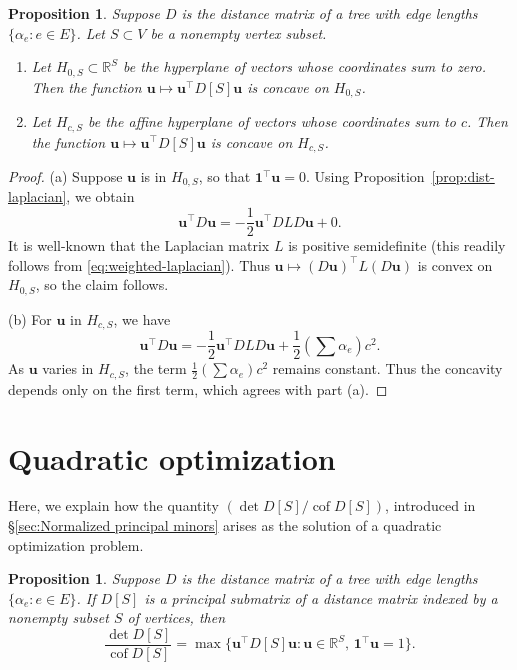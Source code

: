 \documentclass[12pt]{amsart}
\newtheorem{prop}[thm]{Proposition}
\theoremstyle{definition}
\newcommand{\RR}{\mathbb{R}}
\newcommand{\bone}{\mathbf{1}}
\newcommand{\boldu}{\mathbf{u}}
\newcommand{\tr}{\intercal}
\DeclareMathOperator{\cof}{cof}
\begin{document}
\begin{prop}
\label{prop:negdef-hyperplane}
Suppose $D$ is the distance matrix of a tree with edge lengths $\{\alpha_e \colon e \in E\}$.
Let $S \subset V$ be a nonempty vertex subset.
\begin{enumerate}[label=(\alph*)]

\item Let $H_{0, S} \subset \RR^S$ be the hyperplane of vectors whose coordinates sum to zero.
Then the function $\boldu \mapsto \boldu^\tr D[S] \boldu$ is concave on $H_{0, S}$.

\item Let $H_{c, S}$ be the affine hyperplane of vectors whose coordinates sum to $c$.
Then the function $\boldu \mapsto \boldu^\tr D[S] \boldu$ is concave on $H_{c, S}$.

\end{enumerate}
\end{prop}
\begin{proof}
(a)
Suppose $\boldu$ is in $H_{0, S}$, so that $\bone^\tr \boldu = 0$.
Using Proposition~\ref{prop:dist-laplacian}, we obtain
\[
	\boldu^\tr D\boldu = - \frac12 \boldu^\tr DLD \boldu + 0.
\]
It is well-known that the Laplacian matrix $L$ is positive semidefinite (this readily follows from \eqref{eq:weighted-laplacian}). 
Thus $\boldu \mapsto (D \boldu)^\tr L (D \boldu)$ is convex on $H_{0, S}$, so the claim follows.

(b)
For $\boldu$ in $H_{c, S}$, we have
\[
	\boldu^\tr D\boldu = - \frac12 \boldu^\tr DLD \boldu + \frac12 \left(\sum \alpha_e\right) c^2 .
\]
As $\boldu$ varies in $H_{c, S}$, the term $\frac12 \left(\sum \alpha_e\right) c^2$ remains constant.
Thus the concavity depends only on the first term, which agrees with part (a).
\end{proof}


\section{Quadratic optimization}
\label{sec:optimization}

Here, we explain how the quantity $({\det D[S]}/{\cof D[S]})$, introduced in \S\ref{sec:Normalized principal minors} arises as the solution of a quadratic optimization problem.
\begin{prop}
\label{prop:optimization}
Suppose $D$ is the distance matrix of a tree with edge lengths $\{\alpha_e \colon e \in E\}$. 
If $D[S]$ is a principal submatrix of a distance matrix indexed by a nonempty subset $S$ of vertices, then 
\[
	\frac{\det D[S]}{\cof D[S]} = \max \{\boldu^\tr D[S] \boldu \colon \boldu \in \RR^S,\, \bone^\tr \boldu = 1 \}.
\]
\end{prop}
\end{document}
